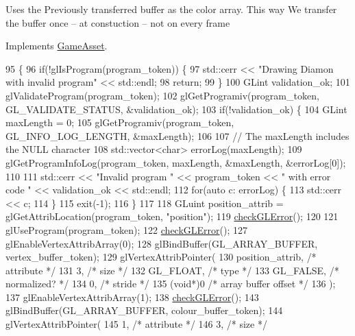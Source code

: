 Uses the Previously transferred buffer as the color array. This way We transfer the buffer once -- at constuction -- not on every frame

Implements \hyperlink{classGameAsset_a961aa51ca0a9961fc584c0b5d5431300}{Game\+Asset}.


\begin{DoxyCode}
95                                            \{
96   \textcolor{keywordflow}{if}(!glIsProgram(program\_token)) \{
97     std::cerr << \textcolor{stringliteral}{"Drawing Diamon with invalid program"} << std::endl;
98     \textcolor{keywordflow}{return};
99   \}
100   GLint validation\_ok;
101   glValidateProgram(program\_token);
102   glGetProgramiv(program\_token, GL\_VALIDATE\_STATUS, &validation\_ok);
103   \textcolor{keywordflow}{if}(!validation\_ok) \{
104     GLint maxLength = 0;
105     glGetProgramiv(program\_token, GL\_INFO\_LOG\_LENGTH, &maxLength);
106 
107     \textcolor{comment}{// The maxLength includes the NULL character}
108     std::vector<char> errorLog(maxLength);
109     glGetProgramInfoLog(program\_token, maxLength, &maxLength, &errorLog[0]);
110 
111     std::cerr << \textcolor{stringliteral}{"Invalid program "} << program\_token << \textcolor{stringliteral}{" with error code "} << validation\_ok << std::endl;
112     \textcolor{keywordflow}{for}(\textcolor{keyword}{auto} c: errorLog) \{
113       std::cerr << c;
114     \}
115     exit(-1);
116   \}
117 
118   GLuint position\_attrib = glGetAttribLocation(program\_token, \textcolor{stringliteral}{"position"});
119   \hyperlink{LeavesAsset_8cc_a75f201b0e53e68726854997957322b8d}{checkGLError}();
120 
121   glUseProgram(program\_token);
122   \hyperlink{LeavesAsset_8cc_a75f201b0e53e68726854997957322b8d}{checkGLError}();
127   glEnableVertexAttribArray(0);
128   glBindBuffer(GL\_ARRAY\_BUFFER, vertex\_buffer\_token);
129   glVertexAttribPointer(
130     position\_attrib,        \textcolor{comment}{/* attribute */}
131     3,        \textcolor{comment}{/* size */}
132     GL\_FLOAT,   \textcolor{comment}{/* type */}
133     GL\_FALSE,   \textcolor{comment}{/* normalized? */}
134     0,        \textcolor{comment}{/* stride */}
135     (\textcolor{keywordtype}{void}*)0    \textcolor{comment}{/* array buffer offset */}
136   );
137   glEnableVertexAttribArray(1);
138   \hyperlink{LeavesAsset_8cc_a75f201b0e53e68726854997957322b8d}{checkGLError}();
143   glBindBuffer(GL\_ARRAY\_BUFFER, colour\_buffer\_token);
144   glVertexAttribPointer(
145     1,        \textcolor{comment}{/* attribute */}
146     3,        \textcolor{comment}{/* size */}

\end{DoxyCode}
